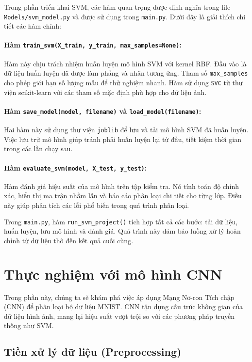 \documentclass[../DoAn.tex]{subfiles}
\begin{document}
Trong phần triển khai SVM, các hàm quan trọng được định nghĩa trong file \texttt{Models/svm\_model.py} và được sử dụng trong \texttt{main.py}. Dưới đây là giải thích chi tiết các hàm chính:

\paragraph{Hàm \texttt{train\_svm(X\_train, y\_train, max\_samples=None)}:}
Hàm này chịu trách nhiệm huấn luyện mô hình SVM với kernel RBF. Đầu vào là dữ liệu huấn luyện đã được làm phẳng và nhãn tương ứng. Tham số \texttt{max\_samples} cho phép giới hạn số lượng mẫu để thử nghiệm nhanh. Hàm sử dụng \texttt{SVC} từ thư viện scikit-learn với các tham số mặc định phù hợp cho dữ liệu ảnh.

\paragraph{Hàm \texttt{save\_model(model, filename)} và \texttt{load\_model(filename)}:}
Hai hàm này sử dụng thư viện \texttt{joblib} để lưu và tải mô hình SVM đã huấn luyện. Việc lưu trữ mô hình giúp tránh phải huấn luyện lại từ đầu, tiết kiệm thời gian trong các lần chạy sau.

\paragraph{Hàm \texttt{evaluate\_svm(model, X\_test, y\_test)}:}
Hàm đánh giá hiệu suất của mô hình trên tập kiểm tra. Nó tính toán độ chính xác, hiển thị ma trận nhầm lẫn và báo cáo phân loại chi tiết cho từng lớp. Điều này giúp phân tích các lỗi phổ biến trong quá trình phân loại.

Trong \texttt{main.py}, hàm \texttt{run\_svm\_project()} tích hợp tất cả các bước: tải dữ liệu, huấn luyện, lưu mô hình và đánh giá. Quá trình này đảm bảo luồng xử lý hoàn chỉnh từ dữ liệu thô đến kết quả cuối cùng.
\\
\section{Thực nghiệm với mô hình CNN}

Trong phần này, chúng ta sẽ khám phá việc áp dụng Mạng Nơ-ron Tích chập (CNN) để phân loại bộ dữ liệu MNIST. CNN tận dụng cấu trúc không gian của dữ liệu hình ảnh, mang lại hiệu suất vượt trội so với các phương pháp truyền thống như SVM.
\\
\subsection{Tiền xử lý dữ liệu (Preprocessing)}
\end{document}
